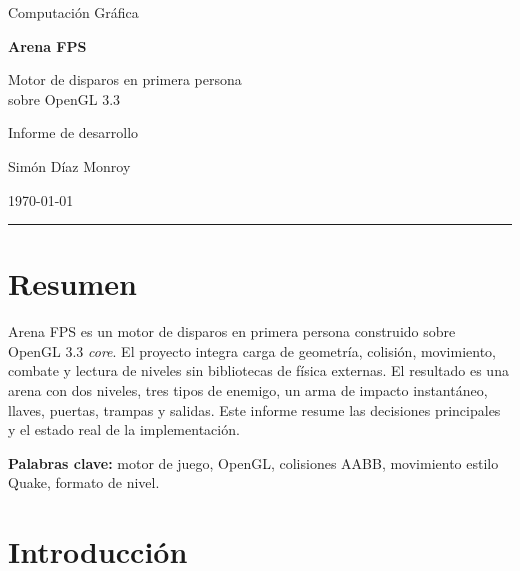 \documentclass[12pt,a4paper]{article}
\begin{document}
\shorthandoff{<>}

\hypersetup{pageanchor=false}
\begin{titlepage}
  \centering
  \vspace*{1.8cm}
  {\large Computación Gráfica\par}
  \vspace{1.6cm}
  {\Huge\bfseries Arena FPS\par}
  \vspace{0.5cm}
  {\LARGE Motor de disparos en primera persona\\[0.2cm] sobre OpenGL 3.3\par}
  \vspace{1.6cm}
  {\large Informe de desarrollo\par}
  \vfill
  {\large Simón Díaz Monroy\par}
  \vspace{0.3cm}
  {\large \today\par}
  \vspace{1.2cm}
  \rule{0.55\textwidth}{0.4pt}
\end{titlepage}
\hypersetup{pageanchor=true}

\section*{Resumen}

Arena FPS es un motor de disparos en primera persona construido sobre OpenGL
3.3 \emph{core}. El proyecto integra carga de geometría, colisión, movimiento,
combate y lectura de niveles sin bibliotecas de física externas. El resultado es
una arena con dos niveles, tres tipos de enemigo, un arma de impacto
instantáneo, llaves, puertas, trampas y salidas. Este informe resume las
decisiones principales y el estado real de la implementación.

\vspace{0.4em}
\noindent\textbf{Palabras clave:} motor de juego, OpenGL, colisiones AABB,
movimiento estilo Quake, formato de nivel.

\section{Introducción}
\end{document}
